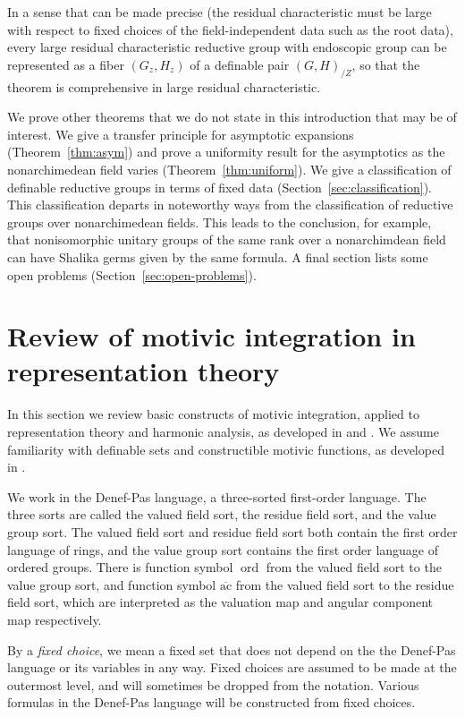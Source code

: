 \documentclass[12pt]{amsart}
\newcommand{\op}[1]{\operatorname{#1}}
\newcommand\ac{\overline{\mathrm{ac}}}
\theoremstyle{plain}
\theoremstyle{definition}
\begin{document}
In a sense that can be made precise (the residual characteristic must
be large with respect to fixed choices of the field-independent data
such as the root data), every large residual characteristic reductive
group with endoscopic group can be represented as a fiber $(G_z,H_z)$
of a definable pair $(G,H)_{/Z}$, so that the theorem is comprehensive in
large residual characteristic.

We prove other theorems that we do not state in this introduction that
may be of interest.  We give a transfer principle for asymptotic
expansions (Theorem~\ref{thm:asym}) and prove a uniformity result for
the asymptotics as the nonarchimedean field varies
(Theorem~\ref{thm:uniform}).  We give a classification of definable
reductive groups in terms of fixed data
(Section~\ref{sec:classification}).  This classification departs in
noteworthy ways from the classification of reductive groups over
nonarchimedean fields.  This leads to the conclusion, for example,
that nonisomorphic unitary groups of the same rank over a
nonarchimdean field can have Shalika germs given by the same formula.
A final section lists some open problems
(Section~\ref{sec:open-problems}).


\section{Review of motivic integration in representation theory}

In this section we review basic constructs of motivic integration,
applied to representation theory and harmonic analysis, as developed
in \cite{CHL} and \cite{CGH}.  We assume familiarity with definable
sets and constructible motivic functions, as developed in \cite{CL}.

We work in the Denef-Pas language, a three-sorted first-order
language.  The three sorts are called the valued field sort, the
residue field sort, and the value group sort.  The valued field sort
and residue field sort both contain the first order language of rings,
and the value group sort contains the first order language of ordered
groups.  There is function symbol $\op{ord}$ from the valued field
sort to the value group sort, and function symbol $\ac$ from the
valued field sort to the residue field sort, which are interpreted as
the valuation map and angular component map respectively.

By a {\it fixed choice}, we mean a fixed set that does not depend
on the the Denef-Pas language or its variables in any way.  Fixed
choices are assumed to be made at the outermost level, and
will sometimes be dropped from the notation.  Various formulas
in the Denef-Pas language will be constructed from fixed choices.
\end{document}
